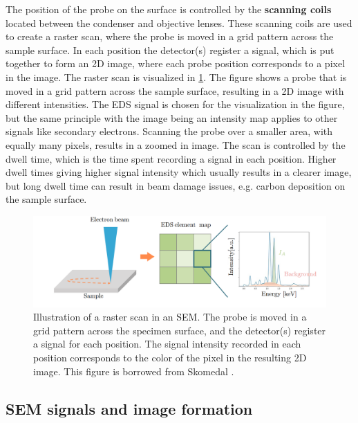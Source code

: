 The position of the probe on the surface is controlled by the \textbf{scanning coils} located between the condenser and objective lenses.
These scanning coils are used to create a raster scan, where the probe is moved in a grid pattern across the sample surface.
In each position the detector(s) register a signal, which is put together to form an 2D image, where each probe position corresponds to a pixel in the image.
The raster scan is visualized in \cref{fig:sem_rasterscan}.
The figure shows a probe that is moved in a grid pattern across the sample surface, resulting in a 2D image with different intensities.
The EDS signal is chosen for the visualization in the figure, but the same principle with the image being an intensity map applies to other signals like secondary electrons.
Scanning the probe over a smaller area, with equally many pixels, results in a zoomed in image.
The scan is controlled by the dwell time, which is the time spent recording a signal in each position.
Higher dwell times giving higher signal intensity which usually results in a clearer image, but long dwell time can result in beam damage issues, e.g. carbon deposition on the sample surface.

\begin{figure}[ht]
    \centering
    \includegraphics[width=0.8\linewidth]{figures/SEM_raster.png}
    \caption{
        Illustration of a raster scan in an SEM.
        The probe is moved in a grid pattern across the specimen surface, and the detector(s) register a signal for each position.
        The signal intensity recorded in each position corresponds to the color of the pixel in the resulting 2D image.
        This figure is borrowed from Skomedal \cite[Fig. 2.14]{skomedal_improving_2022}.
    }
    \label{fig:sem_rasterscan}
\end{figure}






\subsection{SEM signals and image formation}
\label{theory:sem:sem_signals}

